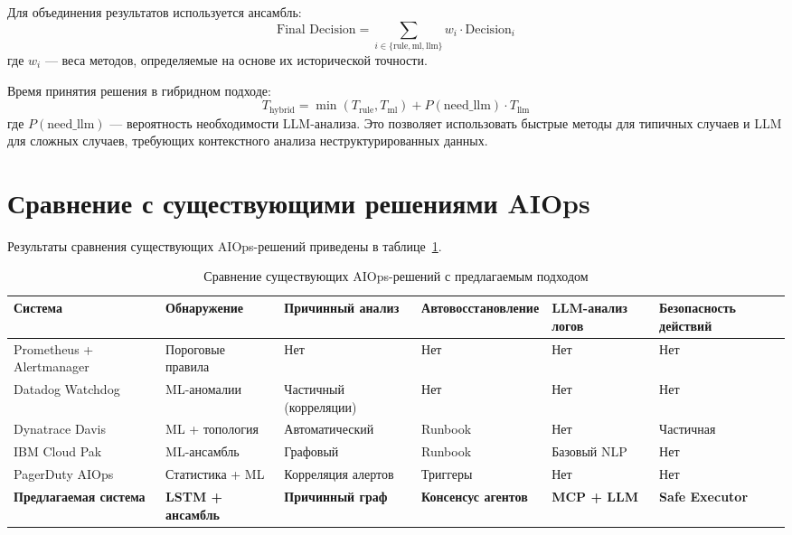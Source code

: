 Для объединения результатов используется ансамбль:
\begin{equation}
\text{Final Decision} = \sum_{i \in \{\text{rule}, \text{ml}, \text{llm}\}} w_i \cdot \text{Decision}_i
\label{eq:ensemble_decision}
\end{equation}
где $w_i$ --- веса методов, определяемые на основе их исторической точности.

Время принятия решения в гибридном подходе:
\begin{equation}
T_{\text{hybrid}} = \min(T_{\text{rule}}, T_{\text{ml}}) + P(\text{need\_llm}) \cdot T_{\text{llm}}
\label{eq:hybrid_time}
\end{equation}
где $P(\text{need\_llm})$ --- вероятность необходимости LLM-анализа. Это позволяет использовать быстрые методы для типичных случаев и LLM для сложных случаев, требующих контекстного анализа неструктурированных данных.

\section{Сравнение с существующими решениями AIOps}

Результаты сравнения существующих AIOps-решений приведены в таблице~\ref{tab:aiops_comparison}.

\begin{table}[H]
\centering
\caption{Сравнение существующих AIOps-решений с предлагаемым подходом}
\label{tab:aiops_comparison}
\begin{tabularx}{\textwidth}{|p{2.5cm}|>{\raggedright\arraybackslash}X|>{\raggedright\arraybackslash}X|>{\raggedright\arraybackslash}X|>{\raggedright\arraybackslash}X|>{\raggedright\arraybackslash}X|}
\hline
\textbf{Система} & \textbf{Обнару\-жение} & \textbf{Причинный анализ} & \textbf{Авто\-восстанов\-ление} & \textbf{LLM-ана\-лиз логов} & \textbf{Безопас\-ность действий} \\
\hline
Prometheus + Alert\-manager & Пороговые правила & Нет & Нет & Нет & Нет \\
\hline
Datadog Watchdog \cite{aiops_survey} & ML-ано\-малии & Частичный (корреляции) & Нет & Нет & Нет \\
\hline
Dynatrace Davis \cite{gartner_aiops} & ML + топология & Автомати\-ческий & Runbook & Нет & Частичная \\
\hline
IBM Cloud Pak \cite{gartner_aiops} & ML-ансамбль & Графовый & Runbook & Базовый NLP & Нет \\
\hline
PagerDuty AIOps \cite{aiops_survey} & Статистика + ML & Корреляция алертов & Триггеры & Нет & Нет \\
\hline
\textbf{Предлага\-емая система} & \textbf{LSTM + ансамбль} & \textbf{Причинный граф} & \textbf{Консенсус агентов} & \textbf{MCP + LLM} & \textbf{Safe Executor} \\
\hline
\end{tabularx}
\end{table}

